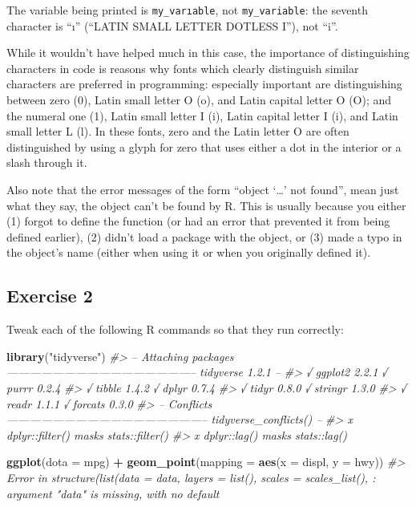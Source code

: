 \documentclass[]{book}
\newenvironment{Shaded}{\begin{snugshade}}{\end{snugshade}}
\newcommand{\CommentTok}[1]{\textcolor[rgb]{0.56,0.35,0.01}{\textit{#1}}}
\newcommand{\DataTypeTok}[1]{\textcolor[rgb]{0.13,0.29,0.53}{#1}}
\newcommand{\KeywordTok}[1]{\textcolor[rgb]{0.13,0.29,0.53}{\textbf{#1}}}
\newcommand{\NormalTok}[1]{#1}
\newcommand{\OperatorTok}[1]{\textcolor[rgb]{0.81,0.36,0.00}{\textbf{#1}}}
\newcommand{\StringTok}[1]{\textcolor[rgb]{0.31,0.60,0.02}{#1}}
\theoremstyle{definition}
\theoremstyle{definition}
\theoremstyle{definition}
\theoremstyle{remark}
\begin{document}
The variable being printed is \texttt{my\_varıable}, not
\texttt{my\_variable}: the seventh character is ``ı'' (``LATIN SMALL
LETTER DOTLESS I''), not ``i''.

While it wouldn't have helped much in this case, the importance of
distinguishing characters in code is reasons why fonts which clearly
distinguish similar characters are preferred in programming: especially
important are distinguishing between zero (0), Latin small letter O (o),
and Latin capital letter O (O); and the numeral one (1), Latin small
letter I (i), Latin capital letter I (i), and Latin small letter L (l).
In these fonts, zero and the Latin letter O are often distinguished by
using a glyph for zero that uses either a dot in the interior or a slash
through it.

Also note that the error messages of the form ``object `\ldots{}' not
found'', mean just what they say, the object can't be found by R. This
is usually because you either (1) forgot to define the function (or had
an error that prevented it from being defined earlier), (2) didn't load
a package with the object, or (3) made a typo in the object's name
(either when using it or when you originally defined it).

\hypertarget{exercise-2}{%
\subsection{Exercise 2}\label{exercise-2}}

Tweak each of the following R commands so that they run correctly:

\begin{Shaded}
\begin{Highlighting}[]
\KeywordTok{library}\NormalTok{(}\StringTok{"tidyverse"}\NormalTok{)}
\CommentTok{#> -- Attaching packages -------------------------------------------------- tidyverse 1.2.1 --}
\CommentTok{#> √ ggplot2 2.2.1     √ purrr   0.2.4}
\CommentTok{#> √ tibble  1.4.2     √ dplyr   0.7.4}
\CommentTok{#> √ tidyr   0.8.0     √ stringr 1.3.0}
\CommentTok{#> √ readr   1.1.1     √ forcats 0.3.0}
\CommentTok{#> -- Conflicts ----------------------------------------------------- tidyverse_conflicts() --}
\CommentTok{#> x dplyr::filter() masks stats::filter()}
\CommentTok{#> x dplyr::lag()    masks stats::lag()}

\KeywordTok{ggplot}\NormalTok{(}\DataTypeTok{dota =}\NormalTok{ mpg) }\OperatorTok{+}\StringTok{ }
\StringTok{  }\KeywordTok{geom_point}\NormalTok{(}\DataTypeTok{mapping =} \KeywordTok{aes}\NormalTok{(}\DataTypeTok{x =}\NormalTok{ displ, }\DataTypeTok{y =}\NormalTok{ hwy))}
\CommentTok{#> Error in structure(list(data = data, layers = list(), scales = scales_list(), : argument "data" is missing, with no default}
\end{Highlighting}
\end{Shaded}
\end{document}
